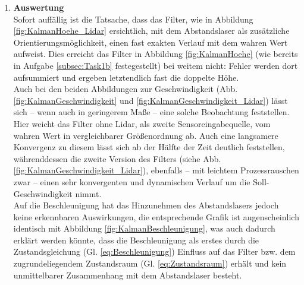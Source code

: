 \documentclass[12pt,a4paper]{article}
\begin{document}
\begin{enumerate}[label=\textbf{\arabic*})]
\begin{enumerate}[label=\textbf{\alph*})]
		\item \textbf{Auswertung}\label{subsec:Auswertung}\\
		
		Sofort auffällig ist die Tatsache, dass das Filter, wie in Abbildung \ref{fig:KalmanHoehe_Lidar} ersichtlich, mit dem Abstandslaser als zusätzliche Orientierungsmöglichkeit, einen fast exakten Verlauf mit dem wahren Wert aufweist. Dies erreicht das Filter in Abbildung \ref{fig:KalmanHoehe} (wie bereits in Aufgabe \ref{subsec:Task1b} festegestellt) bei weitem nicht: Fehler werden dort aufsummiert und ergeben letztendlich fast die doppelte Höhe.\\
		
		Auch bei den beiden Abbildungen zur Geschwindigkeit (Abb. \ref{fig:KalmanGeschwindigkeit} und \ref{fig:KalmanGeschwindigkeit_Lidar}) lässt sich -- wenn auch in geringerem Maße -- eine solche Beobachtung feststellen. Hier weicht das Filter ohne Lidar, als zweite Sensoreingabequelle, vom wahren Wert in vergleichbarer Größenordnung ab. Auch eine langsamere Konvergenz zu diesem lässt sich ab der Hälfte der Zeit deutlich feststellen, währenddessen die zweite Version des Filters (siehe Abb. \ref{fig:KalmanGeschwindigkeit_Lidar}), ebenfalls -- mit leichtem Prozessrauschen zwar -- einen sehr konvergenten und dynamischen Verlauf um die Soll-Geschwindigkeit nimmt.\\
		
		Auf die Beschleunigung hat das Hinzunehmen des Abstandslasers jedoch keine erkennbaren Auswirkungen, die entsprechende Grafik ist augenscheinlich identisch mit Abbildung \ref{fig:KalmanBeschleunigung}, was auch dadurch erklärt werden könnte, dass die Beschleunigung als erstes durch die Zustandsgleichung (Gl. \ref{eq:Beschleunigung}) Einfluss auf das Filter bzw. dem zugrundeliegendem Zustandsraum (Gl. \ref{eq:Zustandsraum}) erhält und kein unmittelbarer Zusammenhang mit dem Abstandslaser besteht.\\
		

\end{enumerate}
\end{enumerate}
\end{document}
